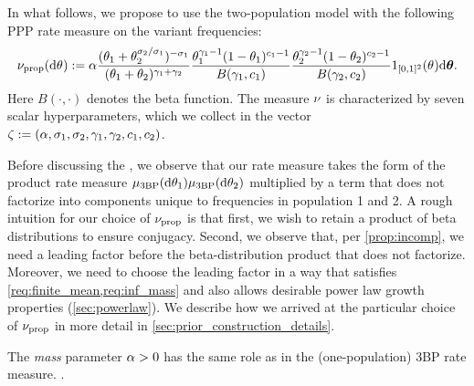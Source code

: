 
In what follows, we propose to use the two-population model with the following PPP rate measure on the variant frequencies:
\begin{equation}
	\ratemeasproposed(\de\vecvariantfreq{}) := \mass
			\frac{(\variantfreqperpop{1}+\variantfreqperpop{2}^{\rate{2}/\rate{1}})^{-\rate{1}}}{(\variantfreqperpop{1}+\variantfreqperpop{2})^{\corr{1}+\corr{2}}}
			\frac{\variantfreqperpop{1}^{\corr{1}-1}(1-\variantfreqperpop{1})^{\conc{1}-1}}{B(\corr{1}, \conc{1})}\frac{\variantfreqperpop{2}^{\corr{2}-1}(1-\variantfreqperpop{2})^{\conc{2}-1}}{B(\corr{2}, \conc{2})} \bm{1}_{[0,1]^2} (\vecvariantfreq{}) \de\btheta.
	\label{eq:proposed_prior}
\end{equation}
Here $B(\cdot, \cdot)$ denotes the beta function. 
The measure $\nu$ is characterized by seven scalar hyperparameters, which we collect in the vector $\allhyper := (\mass, \rate{1}, \rate{2}, \corr{1}, \corr{2}, \conc{1}, \conc{2})$.

Before discussing the , we observe that our rate measure takes the form of the product rate measure $\mu_{\mathrm{3BP}}(\mathrm{d}\theta_{1}) \mu_{\mathrm{3BP}}(\mathrm{d}\theta_{2})$ multiplied by a term that does not factorize into components unique to 
frequencies in population 1 and 2. 
A rough intuition for our choice of $\nu_{\mathrm{prop}}$ is that first, we wish to retain a product of beta distributions to ensure conjugacy.
Second, we observe that, per \cref{prop:incomp}, we need a leading factor before the beta-distribution product that does not factorize. Moreover,
we need to choose the leading factor in a way that satisfies \cref{req:finite_mean,req:inf_mass} and also allows desirable power law growth properties (\cref{sec:powerlaw}). We describe how we arrived at the particular choice of $\nu_{\mathrm{prop}}$ in more detail in \cref{sec:prior_construction_details}.

The \emph{mass} parameter $\alpha>0$ has the same role as in the (one-population) 3BP rate measure. .

